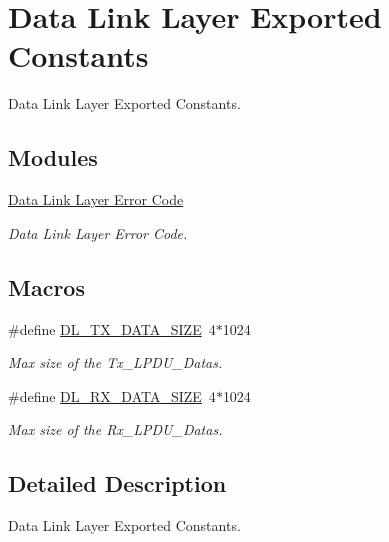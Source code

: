 \hypertarget{group___d_l___exported___constants}{}\section{Data Link Layer Exported Constants}
\label{group___d_l___exported___constants}


Data Link Layer Exported Constants.  


\subsection*{Modules}
\begin{DoxyCompactItemize}
\item 
\hyperlink{group___d_l___error___code}{Data Link Layer Error Code}
\begin{DoxyCompactList}\small\item\em Data Link Layer Error Code. \end{DoxyCompactList}\end{DoxyCompactItemize}
\subsection*{Macros}
\begin{DoxyCompactItemize}
\item 
\#define \hyperlink{group___d_l___exported___constants_gae7b01d80da6448f1b4eea77823660d3c}{D\+L\+\_\+\+T\+X\+\_\+\+D\+A\+T\+A\+\_\+\+S\+I\+ZE}~4$\ast$1024\hypertarget{group___d_l___exported___constants_gae7b01d80da6448f1b4eea77823660d3c}{}\label{group___d_l___exported___constants_gae7b01d80da6448f1b4eea77823660d3c}

\begin{DoxyCompactList}\small\item\em Max size of the Tx\+\_\+\+L\+P\+D\+U\+\_\+\+Datas. \end{DoxyCompactList}\item 
\#define \hyperlink{group___d_l___exported___constants_ga62005b13a5a83d93b632643dd622bcef}{D\+L\+\_\+\+R\+X\+\_\+\+D\+A\+T\+A\+\_\+\+S\+I\+ZE}~4$\ast$1024\hypertarget{group___d_l___exported___constants_ga62005b13a5a83d93b632643dd622bcef}{}\label{group___d_l___exported___constants_ga62005b13a5a83d93b632643dd622bcef}

\begin{DoxyCompactList}\small\item\em Max size of the Rx\+\_\+\+L\+P\+D\+U\+\_\+\+Datas. \end{DoxyCompactList}\end{DoxyCompactItemize}


\subsection{Detailed Description}
Data Link Layer Exported Constants. 

